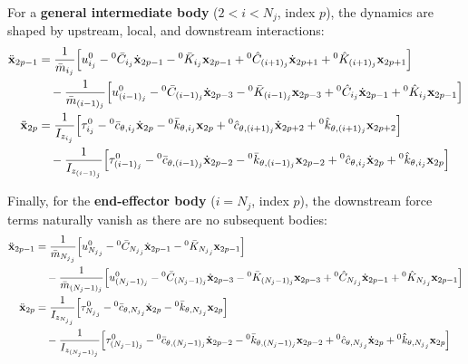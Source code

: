 For a \textbf{general intermediate body} ($2 < i < N_j$, index $p$), the dynamics are shaped by upstream, local, and downstream interactions:
\begin{align}
    \ddot{\mathbf{x}}_{2p-1} &= 
    \frac{1}{\bar{m}_{i_j}} \Big[ u^0_{i_j} - {}^0\bar{C}_{i_j}\dot{\mathbf{x}}_{2p-1} - {}^0\bar{K}_{i_j}\mathbf{x}_{2p-1} + {}^0\hat{C}_{(i+1)_j}\dot{\mathbf{x}}_{2p+1} + {}^0\hat{K}_{(i+1)_j}\mathbf{x}_{2p+1} \Big] \notag \\
    &\quad - \frac{1}{\bar{m}_{(i-1)_j}} \Big[ u^0_{(i-1)_j} - {}^0\bar{C}_{(i-1)_j}\dot{\mathbf{x}}_{2p-3} - {}^0\bar{K}_{(i-1)_j}\mathbf{x}_{2p-3} + {}^0\hat{C}_{i_j}\dot{\mathbf{x}}_{2p-1} + {}^0\hat{K}_{i_j}\mathbf{x}_{2p-1} \Big] \\
    \ddot{\mathbf{x}}_{2p} &= 
    \frac{1}{I_{z_{i_j}}} \Big[ \tau^0_{i_j} - {}^0\bar{c}_{\theta,i_j}\dot{\mathbf{x}}_{2p} - {}^0\bar{k}_{\theta,i_j}\mathbf{x}_{2p} + {}^0\hat{c}_{\theta,(i+1)_j}\dot{\mathbf{x}}_{2p+2} + {}^0\hat{k}_{\theta,(i+1)_j}\mathbf{x}_{2p+2} \Big] \notag \\
    &\quad - \frac{1}{I_{z_{(i-1)_j}}} \Big[ \tau^0_{(i-1)_j} - {}^0\bar{c}_{\theta,(i-1)_j}\dot{\mathbf{x}}_{2p-2} - {}^0\bar{k}_{\theta,(i-1)_j}\mathbf{x}_{2p-2} + {}^0\hat{c}_{\theta,i_j}\dot{\mathbf{x}}_{2p} + {}^0\hat{k}_{\theta,i_j}\mathbf{x}_{2p} \Big]
\end{align}

Finally, for the \textbf{end-effector body} ($i = N_j$, index $p$), the downstream force terms naturally vanish as there are no subsequent bodies:
\begin{align}
    \ddot{\mathbf{x}}_{2p-1} &= 
    \frac{1}{\bar{m}_{{N_j}_j}} \Big[ u^0_{{N_j}_j} - {}^0\bar{C}_{{N_j}_j}\dot{\mathbf{x}}_{2p-1} - {}^0\bar{K}_{{N_j}_j}\mathbf{x}_{2p-1} \Big] \notag \\
    &\quad - \frac{1}{\bar{m}_{({N_j}-1)_j}} \Big[ u^0_{({N_j}-1)_j} - {}^0\bar{C}_{({N_j}-1)_j}\dot{\mathbf{x}}_{2p-3} - {}^0\bar{K}_{({N_j}-1)_j}\mathbf{x}_{2p-3} + {}^0\hat{C}_{{N_j}_j}\dot{\mathbf{x}}_{2p-1} + {}^0\hat{K}_{{N_j}_j}\mathbf{x}_{2p-1} \Big] \\
    \ddot{\mathbf{x}}_{2p} &= 
    \frac{1}{I_{z_{{N_j}_j}}} \Big[ \tau^0_{{N_j}_j} - {}^0\bar{c}_{\theta,{N_j}_j}\dot{\mathbf{x}}_{2p} - {}^0\bar{k}_{\theta,{N_j}_j}\mathbf{x}_{2p} \Big] \notag \\
    &\quad - \frac{1}{I_{z_{({N_j}-1)_j}}} \Big[ \tau^0_{({N_j}-1)_j} - {}^0\bar{c}_{\theta,({N_j}-1)_j}\dot{\mathbf{x}}_{2p-2} - {}^0\bar{k}_{\theta,({N_j}-1)_j}\mathbf{x}_{2p-2} + {}^0\hat{c}_{\theta,{N_j}_j}\dot{\mathbf{x}}_{2p} + {}^0\hat{k}_{\theta,{N_j}_j}\mathbf{x}_{2p} \Big]
\end{align}